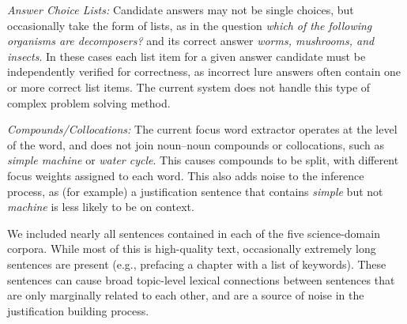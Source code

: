 {\flushleft \emph{Answer Choice Lists: }}
Candidate answers may not be single choices, but occasionally take the form of lists, as in the question \emph{which of the following organisms are decomposers?} and its correct answer \emph{worms, mushrooms, and insects}.  In these cases each list item for a given answer candidate must be independently verified for correctness, as incorrect lure answers often contain one or more correct list items.  The current system does not handle this type of complex problem solving method. 

{\flushleft \emph{Compounds/Collocations: }}
The current focus word extractor operates at the level of the word, and does not join noun--noun compounds or collocations, such as \emph{simple machine} or \emph{water cycle}.  This causes compounds to be split, with different focus weights assigned to each word.  This also adds noise to the inference process, as (for example) a justification sentence that contains \emph{simple} but not \emph{machine} is less likely to be on context. 
  

{}
We included nearly all sentences contained in each of the five science-domain corpora.  While most of this is high-quality text, occasionally extremely long sentences are present (e.g., prefacing a chapter with a list of keywords).  These sentences can cause broad topic-level lexical connections between sentences that are only marginally related to each other, and are a source of noise in the justification building process.  



 
